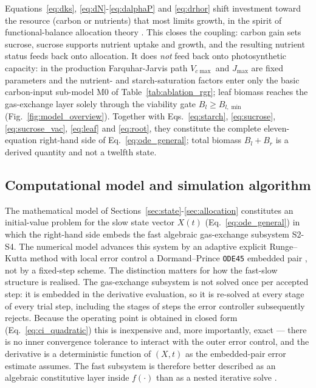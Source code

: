 \documentclass[a4paper,fleqn]{cas-sc}
\begin{document}
Equations~\eqref{eq:dks}, \eqref{eq:dN}-\eqref{eq:dalphaP} and
\eqref{eq:drhor} shift investment toward the resource (carbon or nutrients)
that most limits growth, in the spirit of functional-balance allocation
theory \citep{Thornley1972,ThornleyJohnson1990}. This closes the coupling:
carbon gain sets sucrose, sucrose supports nutrient uptake and growth, and
the resulting nutrient status feeds back onto allocation. It does \emph{not}
feed back onto photosynthetic capacity: in the production Farquhar-Jarvis
path $V_{c\max}$ and $J_{\max}$ are fixed parameters and the nutrient- and
starch-saturation factors enter only the basic carbon-input sub-model M0 of
Table~\ref{tab:ablation_rgr}; leaf biomass reaches the gas-exchange
layer solely through the viability gate $B_l \ge B_{l,\min}$
(Fig.~\ref{fig:model_overview}). Together with Eqs.~\eqref{eq:starch},
\eqref{eq:sucrose}, \eqref{eq:sucrose_vac}, \eqref{eq:leaf} and
\eqref{eq:root}, they constitute the complete eleven-equation right-hand
side of Eq.~\eqref{eq:ode_general}; total biomass $B_l + B_r$ is a derived
quantity and not a twelfth state.

\subsection{Computational model and simulation algorithm}
\label{sec:algorithm}

The mathematical model of Sections~\ref{sec:state}-\ref{sec:allocation}
constitutes an initial-value problem for the slow state vector $X(t)$
(Eq.~\ref{eq:ode_general}) in which the right-hand side embeds the fast
algebraic gas-exchange subsystem S2-S4. The numerical model advances this
system by an adaptive explicit Runge--Kutta method with local error control
a Dormand--Prince \texttt{ODE45} embedded pair
\citep{HairerNorsettWanner1993}, not by a fixed-step scheme. The distinction
matters for how the fast-slow structure is realised.
The gas-exchange subsystem is not solved once per accepted step: it is
embedded in the derivative evaluation, so it is re-solved at every stage of
every trial step, including the stages of steps the error controller
subsequently rejects. Because the operating point is obtained in closed form
(Eq.~\eqref{eq:ci_quadratic}) this is inexpensive and, more importantly,
exact --- there is no inner convergence tolerance to interact with the outer
error control, and the derivative is a deterministic function of $(X,t)$ as
the embedded-pair error estimate assumes. The fast subsystem is therefore
better described as an algebraic constitutive layer inside $f(\cdot)$ than as
a nested iterative solve \citep{Cellier1991}.
\end{document}
